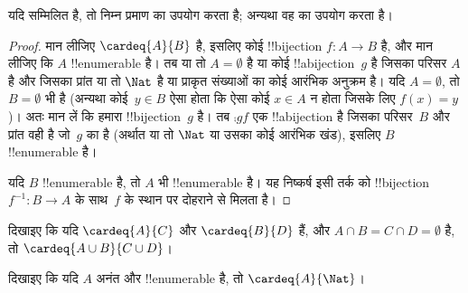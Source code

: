 \documentclass[../../../include/open-logic-section]{subfiles}
\begin{document}
\begin{editorial}
यदि  सम्मिलित है, तो निम्न प्रमाण
 का उपयोग करता है; अन्यथा वह
 का उपयोग करता है।
\end{editorial}

\begin{proof}
मान लीजिए $\cardeq{A}{B}$ है, इसलिए कोई !!{bijection} $f \colon A
\to B$ है, और मान लीजिए कि $A$ !!{enumerable} है।
{
  तब या तो $A  = \emptyset$ है या कोई !!a{bijection}~$g$ है जिसका
  परिसर $A$ है और जिसका प्रांत या तो $\Nat$ है या प्राकृत संख्याओं का कोई
  आरंभिक अनुक्रम है। यदि $A = \emptyset$, तो $B =
  \emptyset$ भी है (अन्यथा कोई~$y \in B$ ऐसा होता कि ऐसा कोई $x
  \in A$ न होता जिसके लिए $f(x) = y$)। अतः मान लें कि हमारा
  !!{bijection}~$g$ है। तब $\comp{g}{f}$ एक !!a{bijection} है जिसका
  परिसर~$B$ और प्रांत वही है जो~$g$ का है (अर्थात या तो $\Nat$ या उसका
  कोई आरंभिक खंड), इसलिए $B$ !!{enumerable} है।}

यदि $B$ !!{enumerable} है, तो $A$ भी !!{enumerable} है। यह निष्कर्ष इसी
तर्क को !!{bijection} $f^{-1}\colon B \to A$ के साथ~$f$ के स्थान पर
दोहराने से मिलता है।
\end{proof}

\begin{prob}
दिखाइए कि यदि $\cardeq{A}{C}$ और $\cardeq{B}{D}$ हैं, और $A \cap B =
C \cap D = \emptyset$ है, तो $\cardeq{A \cup B}{C \cup D}$।
\end{prob}

\begin{prob}
दिखाइए कि यदि $A$ अनंत और !!{enumerable} है, तो
$\cardeq{A}{\Nat}$।
\end{prob}
\end{document}
